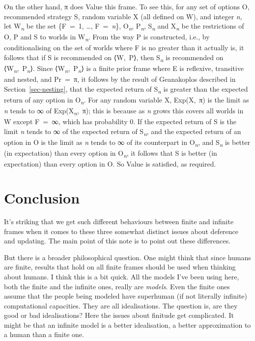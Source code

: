 \documentclass[
  11pt,
  letterpaper,
  DIV=11,
  numbers=noendperiod,
  twoside]{scrartcl}
\begin{document}
On the other hand, π does Value this frame. To see this, for any set of
options O, recommended strategy S, random variable X (all defined on W),
and integer \emph{n}, let W\textsubscript{\emph{n}} be the set \{F~=~1,
\ldots, F~=~\emph{n}\}, O\textsubscript{\emph{n}},
P\textsubscript{\emph{n}}, S\textsubscript{\emph{n}} and
X\textsubscript{\emph{n}} be the restrictions of O, P and S to worlds in
W\textsubscript{\emph{n}}. From the way P is constructed, i.e., by
conditionalising on the set of worlds where F is no greater than it
actually is, it follows that if S is recommended on ⟨W,~P⟩, then
S\textsubscript{\emph{n}} is recommended on
⟨W\textsubscript{\emph{n}},~P\textsubscript{\emph{n}}⟩. Since
⟨W\textsubscript{\emph{n}},~P\textsubscript{\emph{n}}⟩ is a finite prior
frame where E is reflexive, transitive and nested, and Pr~=~π, it
follows by the result of Geanakoplos described in
Section~\ref{sec-nesting}, that the expected return of
S\textsubscript{\emph{n}} is greater than the expected return of any
option in O\textsubscript{\emph{n}}. For any random variable X,
Exp(X,~π) is the limit as \emph{n} tends to ∞ of
Exp(X\textsubscript{\emph{n}},~π); this is because as \emph{n} grows
this covers all worlds in W except F~=~∞, which has probability 0. If
the expected return of S is the limit \emph{n} tends to ∞ of the
expected return of S\emph{\textsubscript{n}}, and the expected return of
an option in O is the limit as \emph{n} tends to ∞ of its counterpart in
O\textsubscript{\emph{n}}, and S\emph{\textsubscript{n}} is better (in
expectation) than every option in O\textsubscript{\emph{n}}, it follows
that S is better (in expectation) than every option in O. So Value is
satisfied, as required.

\section{Conclusion}\label{conclusion}

It's striking that we get such different behaviours between finite and
infinite frames when it comes to these three somewhat distinct issues
about deference and updating. The main point of this note is to point
out these differences.

But there is a broader philosophical question. One might think that
since humans are finite, results that hold on all finite frames should
be used when thinking about humans. I think this is a bit quick. All the
models I've been using here, both the finite and the infinite ones,
really are \emph{models}. Even the finite ones assume that the people
being modeled have superhuman (if not literally infinite) computational
capacities. They are all idealisations. The question is, are they good
or bad idealisations? Here the issues about finitude get complicated. It
might be that an infinite model is a better idealisation, a better
approximation to a human than a finite one.
\end{document}
